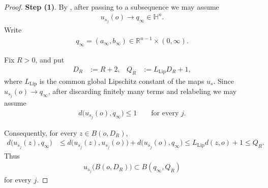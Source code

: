 \documentclass[11pt]{amsart}
\theoremstyle{plain}
\theoremstyle{plain}
\theoremstyle{plain}
\newcommand{\Hn}{\mathbb H^n}
\numberwithin{equation}{section}
\begin{document}
\begin{proof}
\textbf{Step (1)}. By , after passing
to a subsequence we may assume
\begin{align}
u_{s_j}(o)\longrightarrow q_\infty\in\Hn.
\nonumber
\end{align}
Write
\begin{align}
q_\infty=(a_\infty,b_\infty)\in\mathbb R^{n-1}\times(0,\infty).
\nonumber
\end{align}

Fix \(R>0\), and put
\begin{align}
D_R&:=R+2,
&
Q_R&:=L_{\mathrm{Lip}}D_R+1,
\nonumber
\end{align}
where \(L_{\mathrm{Lip}}\) is the common global Lipschitz constant of
the maps \(u_s\).  Since \(u_{s_j}(o)\to q_\infty\), after discarding finitely many
terms and relabeling we may assume
\begin{align}
d\bigl(u_{s_j}(o),q_\infty\bigr)\leq1
\qquad\text{for every }j.
\nonumber
\end{align}

Consequently, for every \(z\in B(o,D_R)\),
\begin{align}
d\bigl(u_{s_j}(z),q_\infty\bigr)
&\leq
d\bigl(u_{s_j}(z),u_{s_j}(o)\bigr)
+d\bigl(u_{s_j}(o),q_\infty\bigr)\leq
L_{\mathrm{Lip}}d(z,o)+1
\leq Q_R.
\nonumber
\end{align}
Thus
\begin{align}
u_{s_j}\bigl(B(o,D_R)\bigr)
\subset B(q_\infty,Q_R)
\label{eq:Us-fixed-target-ball}
\end{align}
for every \(j\).


\end{proof}
\end{document}
